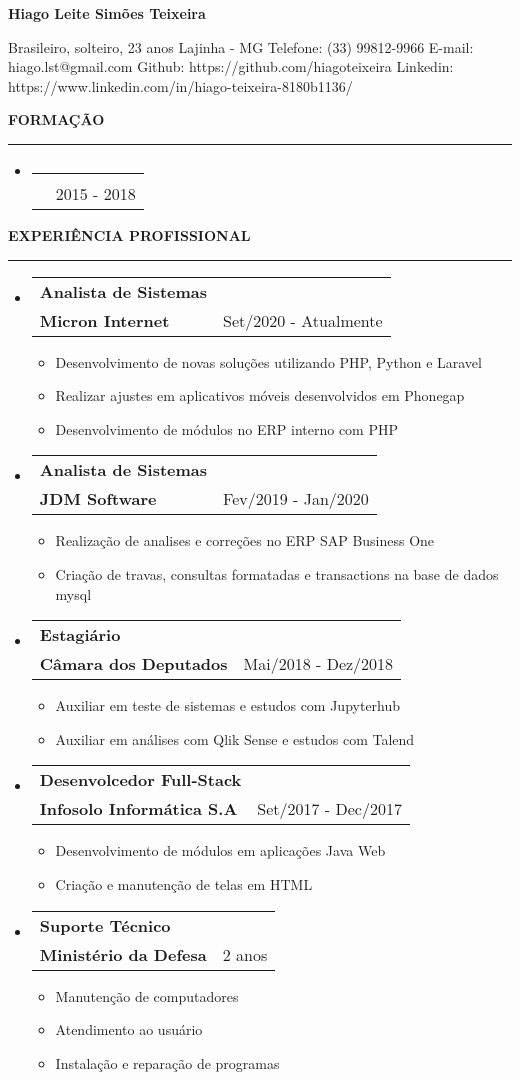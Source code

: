 \documentclass[a4paper,10pt]{article}
\makeatletter
\newcommand{\EducationItem}[3]{
    \item
    \begin{tabular*}{0.93\textwidth}[t]{l@{\extracolsep{\fill}}r}
        \normalfont{#1} & \\
        \small\normalfont{#2} & \scriptsize#3
    \end{tabular*}
}
\newcommand{\WorkExpItem}[3]{
    \item
        \begin{tabular*}{0.93\textwidth}[t]{l@{\extracolsep{\fill}}r}
            \textbf{#1} & \\
            \small\textbf{#2} & \scriptsize#3 \\
        \end{tabular*}
}
\newcommand{\WorkExpActivitiesBegin}[0]{
    \vspace{-5pt}\begin{itemize}
}
\newcommand{\WorkExpActivitiesItem}[1]{
    \vspace{-2pt}\item[]\small #1
}
\newcommand{\WorkExpActivitiesEnd}[0]{
    \end{itemize}\vspace{-7pt}
}
\newcommand{\SectionTitle}[1]{
    \begin{flushleft}
    \textbf{#1}
    \noindent\textcolor{gray}{\rule{18.5cm}{1px}}
    \end{flushleft}
}
\newcommand{\SectionBegin}[0]{
    \vspace{-16pt}\begin{flushleft}
    \begin{itemize}
}
\newcommand{\SectionEnd}[0]{
    \end{itemize}
    \end{flushleft}\vspace{-2pt}
}
\newcommand{\PersonInformation}[7]{
    \begin{flushleft}
        \begin{LARGE}
            \textbf{#1}
        \end{LARGE}
    \end{flushleft}

    \begin{flushleft}
        #2
        \newline
        #3
        \newline
        Telefone: #4
        \newline
        E-mail: #5
        \newline
        Github: #6
        \newline
        Linkedin: #7
        \newline
    \end{flushleft}
}
\makeatother
\begin{document}

\PersonInformation
    {Hiago Leite Simões Teixeira}
    {Brasileiro, solteiro, 23 anos}
    {Lajinha - MG}
    {(33) 99812-9966}
    {hiago.lst@gmail.com}
    {https://github.com/hiagoteixeira}
    {https://www.linkedin.com/in/hiago-teixeira-8180b1136/}

\SectionTitle
    {FORMA\c{C}\~{A}O}
\SectionBegin
    \EducationItem
        {Bacharel em Ciência da Computação}
        {Centro Universitário de Brasília - UniCEUB}
        {2015 - 2018}
\SectionEnd

\SectionTitle
    {EXPERI\^{E}NCIA PROFISSIONAL}
\SectionBegin
    \WorkExpItem
        {Analista de Sistemas}
        {Micron Internet}
        {Set/2020 - Atualmente}
        \WorkExpActivitiesBegin
            \WorkExpActivitiesItem{Desenvolvimento de novas solu\c{c}\~{o}es utilizando PHP, Python e Laravel}
            \WorkExpActivitiesItem{Realizar ajustes em aplicativos móveis desenvolvidos em Phonegap}
            \WorkExpActivitiesItem{Desenvolvimento de módulos no ERP interno com PHP}
        \WorkExpActivitiesEnd
    \WorkExpItem
        {Analista de Sistemas}
        {JDM Software}
        {Fev/2019 - Jan/2020}
        \WorkExpActivitiesBegin
            \WorkExpActivitiesItem{Realiza\c{c}\~{a}o de analises e corre\c{c}\~{o}es no ERP SAP Business One}
            \WorkExpActivitiesItem{Cria\c{c}\~{a}o de travas, consultas formatadas e transactions na base de dados mysql}
        \WorkExpActivitiesEnd
    \WorkExpItem
        {Estagiário}
        {C\^{a}mara dos Deputados}
        {Mai/2018 - Dez/2018}
        \WorkExpActivitiesBegin
            \WorkExpActivitiesItem{Auxiliar em teste de sistemas e estudos com Jupyterhub}
            \WorkExpActivitiesItem{Auxiliar em análises com Qlik Sense e estudos com Talend}
        \WorkExpActivitiesEnd
    \WorkExpItem
        {Desenvolcedor Full-Stack}
        {Infosolo Informática S.A}
        {Set/2017 - Dec/2017}
        \WorkExpActivitiesBegin
            \WorkExpActivitiesItem{Desenvolvimento de módulos em aplicações Java Web}
            \WorkExpActivitiesItem{Criação e manutenção de telas em HTML}
        \WorkExpActivitiesEnd
    \WorkExpItem
        {Suporte Técnico}
        {Ministério da Defesa}
        {2 anos}
        \WorkExpActivitiesBegin
            \WorkExpActivitiesItem{Manutenção de computadores}
            \WorkExpActivitiesItem{Atendimento ao usuário}
            \WorkExpActivitiesItem{Instalação e reparação de programas}
        \WorkExpActivitiesEnd
\SectionEnd
\end{document}
